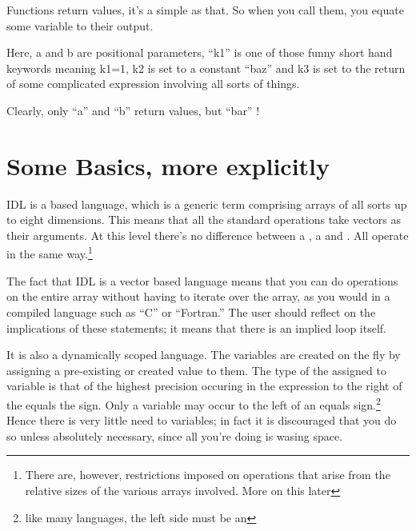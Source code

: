 \documentclass{article}
\begin{document}
   Functions return values, it's a simple as that. So when you call
    them, you equate some variable to their output.  


   Here, a and b are positional parameters, ``k1'' is one of those
  funny short hand keywords meaning k1=1, k2 is set to a constant
  ``baz'' and k3 is set to the return of some complicated expression
  involving all sorts of things.

  Clearly, only ``a'' and ``b''  return values, but ``bar''
  !




\ei
	  

\newpage
\section{Some Basics, more explicitly}

  IDL is a  based language, which is a generic term
  comprising arrays of all sorts up to eight dimensions. This means
  that all the standard operations take vectors as their arguments. At
  this level there's no difference between a , a
   and . All operate in the
  same way.\footnote{There are, however, restrictions imposed on operations
  that arise from the relative sizes of the various arrays
  involved. More on this later}

  The fact that IDL is a vector based language means that you can do
   operations on the entire array without
  having to  iterate over the array, as you would in
  a compiled language such as ``C'' or ``Fortran.'' The user should
  reflect on the implications of these statements; it means that
  there is an implied loop  itself.

  It is also a dynamically scoped language. The variables are created
  on the fly by assigning a pre-existing or created value to them. The
  type of the assigned to variable is that of the highest precision
  occuring in the expression to the right of the equals the sign. Only
  a variable may occur to the left of an equals sign.\footnote{like
  many languages, the left side must be an } Hence there
  is very little need to  variables; in fact it is
  discouraged that you do so unless absolutely necessary, since all
  you're doing is wasing space.
\end{document}

